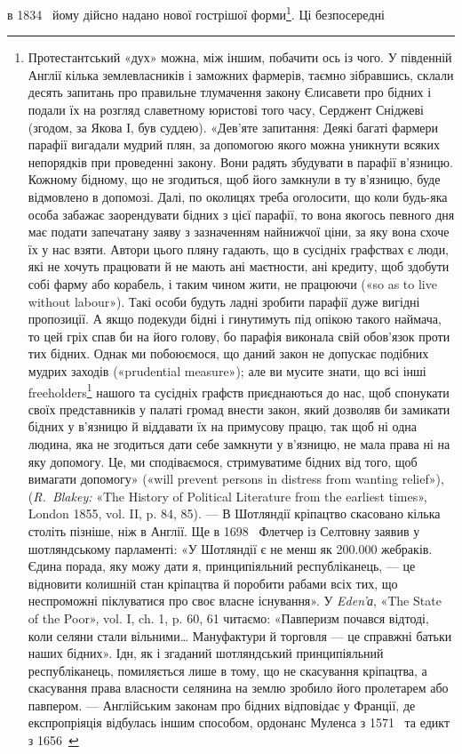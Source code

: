 \parcont{}  %
в 1834~ йому дійсно надано нової гострішої форми\footnote{
Протестантський «дух» можна, між іншим, побачити ось із чого.
У південній Англії кілька землевласників і заможних фармерів, таємно
зібравшись, склали десять запитань про правильне тлумачення закону
Єлисавети про бідних і подали їх на розгляд славетному юристові того
часу, Серджент Сніджеві (згодом, за Якова І, був суддею). «Дев’яте запитання:
Деякі багаті фармери парафії вигадали мудрий плян, за допомогою
якого можна уникнути всяких непорядків при проведенні закону.
Вони радять збудувати в парафії в’язницю. Кожному бідному, що не
згодиться, щоб його замкнули в ту в’язницю, буде відмовлено в допомозі.
Далі, по околицях треба оголосити, що коли будь-яка особа забажає
заорендувати бідних з цієї парафії, то вона якогось певного дня
має подати запечатану заяву з зазначенням найнижчої ціни, за яку вона
схоче їх у нас взяти. Автори цього пляну гадають, що в сусідніх графствах
є люди, які не хочуть працювати й не мають ані маєтности, ані
кредиту, щоб здобути собі фарму або корабель, і таким чином жити,
не працюючи («so as to live without labour»). Такі особи будуть ладні
зробити парафії дуже вигідні пропозиції. А якщо подекуди бідні і гинутимуть
під опікою такого наймача, то цей гріх спав би на його голову,
бо парафія виконала свій обов’язок проти тих бідних. Однак ми побоюємося,
що даний закон не допускає подібних мудрих заходів («prudential
measure»); але ви мусите знати, що всі інші freeholders\footnote*{
вільні дрібні господарства. 
} нашого та
сусідніх графств приєднаються до нас, щоб спонукати своїх представників
у палаті громад внести закон, який дозволяв би замикати бідних у
в’язницю й віддавати їх на примусову працю, так щоб ні одна людина,
яка не згодиться дати себе замкнути у в’язницю, не мала права ні на яку
допомогу. Це, ми сподіваємося, стримуватиме бідних від того, щоб вимагати
допомогу» («will prevent persons in distress from wanting relief»),
(\emph{R.~Blakey:} «The History of Political Literature from the earliest times»,
London 1855, vol. II, p. 84, 85). — В Шотляндії кріпацтво скасовано
кілька століть пізніше, ніж в Англії. Ще в 1698~ Флетчер із Селтовну
заявив у шотляндському парламенті: «У Шотляндії є не менш як \num{200.000}
жебраків. Єдина порада, яку можу дати я, принципіяльний республіканець,
— це відновити колишній стан кріпацтва й поробити рабами всіх
тих, що неспроможні піклуватися про своє власне існування». У \emph{Eden’а},
«The State of the Poor», vol. I, ch. 1, p. 60, 61 читаємо: «Павперизм почався
відтоді, коли селяни стали вільними\dots{} Мануфактури й торговля —
це справжні батьки наших бідних». Ідн, як і згаданий шотляндський
принципіяльний республіканець, помиляється лише в тому, що не скасування
кріпацтва, а скасування права власности селянина на землю
зробило його пролетарем або павпером. — Англійським законам про
бідних відповідає у Франції, де експропріяція відбулась іншим способом,
ордонанс Муленса з 1571~ та едикт з 1656~
}. Ці безпосередні
